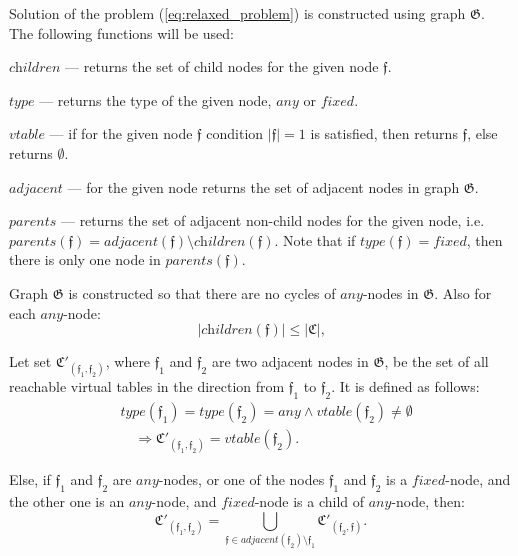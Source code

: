 \documentclass[times, 10pt,twocolumn]{article}
\newcommand{\gC}{\mathfrak{C}}
\newcommand{\gG}{\mathfrak{G}}
\newcommand{\gf}{\mathfrak{f}}
\newcommand{\any}{\textit{any}}
\newcommand{\fixed}{\textit{fixed}}
\newcommand{\children}{\textit{children}}
\newcommand{\type}{\textit{type}}
\newcommand{\vtable}{\textit{vtable}}
\newcommand{\adjacent}{\textit{adjacent}}
\newcommand{\parents}{\textit{parents}}
\begin{document}
Solution of the problem (\ref{eq:relaxed_problem})
is constructed using graph $\gG$.
The following functions will be used:

$\children$ --- returns the set of child nodes for the given node $\gf$.

$\type$ --- returns the type of the given node, $\any$ or $\fixed$.

$\vtable$ --- if for the given node $\gf$ condition $|\gf| = 1$ is satisfied,
then returns $\gf$, else returns $\emptyset$.

$\adjacent$ --- for the given node returns the set
of adjacent nodes in graph $\gG$.

$\parents$ --- returns the set of adjacent non-child nodes for the given node,
i.e. $\parents(\gf) = \adjacent(\gf) \setminus \children(\gf)$.
Note that if $\type(\gf) = \fixed$,
then there is only one node in $\parents(\gf)$.

Graph $\gG$ is constructed so that there are no cycles of $\any$-nodes in $\gG$.
Also for each $\any$-node:
\begin{equation}\label{eq:number_of_children}
|\children(\gf)| \le |\gC| \text{,}
\end{equation}

Let set $\gC'_{(\gf_1, \gf_2)}$,
where $\gf_1$ and $\gf_2$ are two adjacent nodes in $\gG$,
be the set of all reachable virtual tables in the direction
from $\gf_1$ to $\gf_2$.
It is defined as follows:
\begin{equation}\label{eq:cset_for_class}
\begin{aligned}
&\type(\gf_1) = \type(\gf_2) = \any \wedge \vtable(\gf_2) \ne \emptyset \\
&\quad \Longrightarrow \gC'_{(\gf_1, \gf_2)} = \vtable(\gf_2) \text{.}
\end{aligned}
\end{equation}

Else, if 
$\gf_1$ and $\gf_2$ are $\any$-nodes,
or one of the nodes $\gf_1$ and $\gf_2$ is a $\fixed$-node,
and the other one is an $\any$-node,
and $\fixed$-node is a child of $\any$-node, then:
\begin{equation}\label{eq:cset_for_rest}
\gC'_{(\gf_1, \gf_2)} = \bigcup_{\gf \in \adjacent(\gf_2) \setminus \gf_1} \gC'_{(\gf_2, \gf)} \text{.}
\end{equation}
\end{document}
